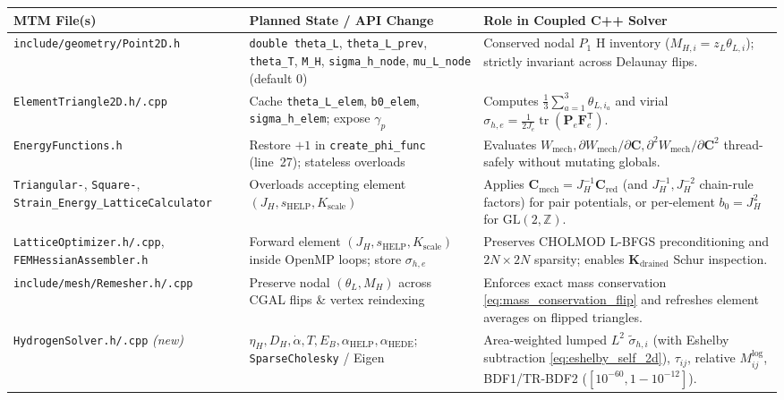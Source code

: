 \documentclass[11pt,a4paper]{article}
\newcommand{\Z}{\mathbb{Z}}
\newcommand{\T}{^{\mathsf T}}
\newcommand{\tr}{\operatorname{tr}}
\newcommand{\code}[1]{\texttt{#1}}
\begin{document}
\begin{table}[ht!]
\centering
\small
\renewcommand{\arraystretch}{1.22}
\begin{tabular}{@{} >{\raggedright\arraybackslash}p{4.4cm} >{\raggedright\arraybackslash}p{4.8cm} >{\raggedright\arraybackslash}p{6.0cm} @{}}
\toprule
\textbf{MTM File(s)} & \textbf{Planned State / API Change} & \textbf{Role in Coupled C++ Solver} \\
\midrule
\code{include/geometry/\allowbreak Point2D.h} & \code{double theta\_L}, \code{theta\_L\_prev}, \code{theta\_T}, \code{M\_H}, \code{sigma\_h\_node}, \code{mu\_L\_node} (default $0$) & Conserved nodal $P_1$ H inventory ($M_{H,i} = z_L \theta_{L,i}$); strictly invariant across Delaunay flips. \\
\addlinespace[2pt]
\code{ElementTriangle2D.h/.cpp} & Cache \code{theta\_L\_elem}, \code{b0\_elem}, \code{sigma\_h\_elem}; expose $\gamma_p$ & Computes $\frac{1}{3}\sum_{a=1}^3 \theta_{L,i_a}$ and virial $\sigma_{h,e} = \frac{1}{2J_e}\tr(\mathbf{P}_e\mathbf{F}_e\T)$. \\
\addlinespace[2pt]
\code{EnergyFunctions.h} & Restore $+1$ in \code{create\_phi\_func} (line~27); stateless overloads & Evaluates $W_{\text{mech}}, \partial W_{\text{mech}}/\partial\mathbf{C}, \partial^2 W_{\text{mech}}/\partial\mathbf{C}^2$ thread-safely without mutating globals. \\
\addlinespace[2pt]
\code{Triangular-}, \code{Square-}, \code{Strain\_Energy\_\allowbreak LatticeCalculator} & Overloads accepting element $(J_H, s_{\text{HELP}}, K_{\text{scale}})$ & Applies $\mathbf{C}_{\text{mech}} = J_H^{-1}\mathbf{C}_{\text{red}}$ (and $J_H^{-1}, J_H^{-2}$ chain-rule factors) for pair potentials, or per-element $b_0 = J_H^2$ for $\mathrm{GL}(2,\Z)$. \\
\addlinespace[2pt]
\code{LatticeOptimizer.h/.cpp}, \code{FEMHessianAssembler.h} & Forward element $(J_H, s_{\text{HELP}}, K_{\text{scale}})$ inside OpenMP loops; store $\sigma_{h,e}$ & Preserves CHOLMOD L-BFGS preconditioning and $2N \times 2N$ sparsity; enables $\mathbf{K}_{\text{drained}}$ Schur inspection. \\
\addlinespace[2pt]
\code{include/mesh/\allowbreak Remesher.h/.cpp} & Preserve nodal $(\theta_L, M_H)$ across CGAL flips \& vertex reindexing & Enforces exact mass conservation \eqref{eq:mass_conservation_flip} and refreshes element averages on flipped triangles. \\
\addlinespace[2pt]
\code{HydrogenSolver.h/.cpp} \emph{(new)} & $\eta_H, D_H, \dot{\alpha}, T, E_B, \alpha_{\text{HELP}}, \alpha_{\text{HEDE}}$; \code{SparseCholesky} / Eigen & Area-weighted lumped $L^2$ $\tilde{\sigma}_{h,i}$ (with Eshelby subtraction \eqref{eq:eshelby_self_2d}), $\tau_{ij}$, relative $M_{ij}^{\text{log}}$, BDF1/TR-BDF2 ($[10^{-60}, 1-10^{-12}]$). \\

\end{tabular}
\end{table}
\end{document}
